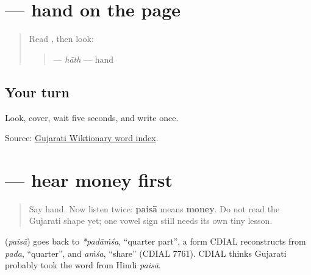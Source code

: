\section[\texorpdfstring{\gu{હાથ} (hāth)}{હાથ (hāth)}]{ — hand on the page}

\label{lesson:GU-C21-haath}



\begin{quote}
Read \textbf{}, then look:

\begin{quote}
\textbf{} — \emph{hāth} — hand
\end{quote}
\end{quote}

\subsection*{Your turn}

Look, cover, wait five seconds, and write \textbf{} once.

\begin{tcolorbox}[breakable,colback=teal!4,colframe=teal!35!black,title={Before you move on}]
Source: \href{https://gu.wiktionary.org/wiki/\%E0\%AA\%B5\%E0\%AA\%BF\%E0\%AA\%95\%E0\%AA\%BF\%E0\%AA\%95\%E0\%AB\%8B\%E0\%AA\%B6:\%E0\%AA\%B6\%E0\%AA\%AC\%E0\%AB\%8D\%E0\%AA\%A6\_\%E0\%AA\%85\%E0\%AA\%A8\%E0\%AB\%81\%E0\%AA\%95\%E0\%AB\%8D\%E0\%AA\%B0\%E0\%AA\%AE\%E0\%AA\%A3\%E0\%AA\%BF\%E0\%AA\%95\%E0\%AA\%BE}{Gujarati Wiktionary word index}.
\end{tcolorbox}
\section[\texorpdfstring{\gu{પૈસા} (paisā)}{પૈસા (paisā)}]{ — hear money first}

\label{lesson:GU-C21-hear-paisa}



\begin{quote}
Say hand. Now listen twice: \textbf{paisā} means \textbf{money}. Do not read the Gujarati shape yet; one vowel sign still needs its own tiny lesson.
\end{quote}

\begin{cousinweb}
\textbf{} (\emph{paisā}) goes back to \emph{*padāṁśa}, \textquotedblleft{}quarter part\textquotedblright{}, a form CDIAL reconstructs from \emph{pada}, \textquotedblleft{}quarter\textquotedblright{}, and \emph{aṁśa}, \textquotedblleft{}share\textquotedblright{} (CDIAL 7761). CDIAL thinks Gujarati probably took the word from Hindi \emph{paisā}.
\end{cousinweb}

